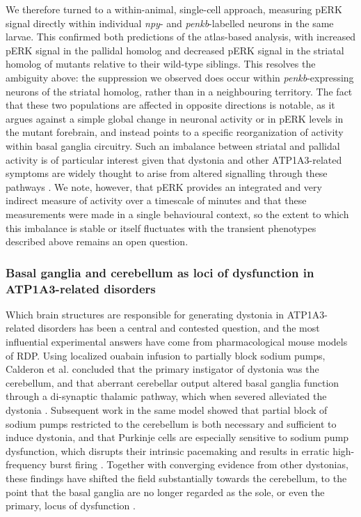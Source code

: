 \documentclass[9.5pt,lineno]{RandlettLab_elife}
\begin{document}
We therefore turned to a within-animal, single-cell approach, measuring pERK signal directly within individual \emph{npy}- and \emph{penkb}-labelled neurons in the same larvae.
This confirmed both predictions of the atlas-based analysis, with increased pERK signal in the pallidal homolog and decreased pERK signal in the striatal homolog of mutants relative to their wild-type siblings.
This resolves the ambiguity above: the suppression we observed does occur within \emph{penkb}-expressing neurons of the striatal homolog, rather than in a neighbouring territory.
The fact that these two populations are affected in opposite directions is notable, as it argues against a simple global change in neuronal activity or in pERK levels in the mutant forebrain, and instead points to a specific reorganization of activity within basal ganglia circuitry.
Such an imbalance between striatal and pallidal activity is of particular interest given that dystonia and other ATP1A3-related symptoms are widely thought to arise from altered signalling through these pathways \citep{Brggemann2021}.
We note, however, that pERK provides an integrated and very indirect measure of activity over a timescale of minutes and that these measurements were made in a single behavioural context, so the extent to which this imbalance is stable or itself fluctuates with the transient phenotypes described above remains an open question.



\subsubsection{Basal ganglia and cerebellum as loci of dysfunction in ATP1A3-related disorders}

Which brain structures are responsible for generating dystonia in ATP1A3-related disorders has been a central and contested question, and the most influential experimental answers have come from pharmacological mouse models of RDP.
Using localized ouabain infusion to partially block sodium pumps, Calderon et al. concluded that the primary instigator of dystonia was the cerebellum, and that aberrant cerebellar output altered basal ganglia function through a di-synaptic thalamic pathway, which when severed alleviated the dystonia \citep{Calderon2011-no}.
Subsequent work in the same model showed that partial block of sodium pumps restricted to the cerebellum is both necessary and sufficient to induce dystonia, and that Purkinje cells are especially sensitive to sodium pump dysfunction, which disrupts their intrinsic pacemaking and results in erratic high-frequency burst firing \citep{Fremont2014}.
Together with converging evidence from other dystonias, these findings have shifted the field substantially towards the cerebellum, to the point that the basal ganglia are no longer regarded as the sole, or even the primary, locus of dysfunction \citep{Tewari2017}.
\end{document}

